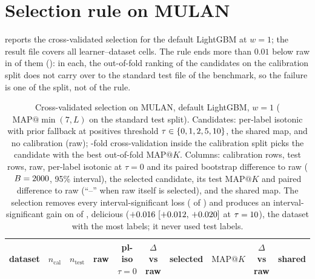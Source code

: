 \documentclass[sigconf,nonacm]{acmart}
\makeatletter
\newcommand{\mapk}{\mathrm{MAP}@K\xspace}
\makeatother
\begin{document}
\section{Selection rule on MULAN}
\label{app:tau}
 reports the cross-validated selection for the default LightGBM at $w{=}1$; the result file covers all \nnTauCells{} learner--dataset cells. The rule ends more than $0.01$ below raw in \nnTauSelBelowRaw{} of them (\ntauFailCells): in each, the out-of-fold ranking of the candidates on the calibration split does not carry over to the standard test file of the benchmark, so the failure is one of the split, not of the rule.
\begin{table}[p]
\caption{Cross-validated selection on MULAN, default LightGBM, $w{=}1$ ($\mathrm{MAP}@\min(7,L)$ on the standard test split). Candidates: per-label isotonic with prior fallback at positives threshold $\tau\in\{0, 1, 2, 5, 10\}$, the shared map, and no calibration (raw); \ntauFolds-fold cross-validation inside the calibration split picks the candidate with the best out-of-fold $\mapk$. Columns: calibration rows, test rows, raw, per-label isotonic at $\tau=0$ and its paired bootstrap difference to raw ($B=2000$, 95\% interval), the selected candidate, its test $\mapk$ and paired difference to raw (``--'' when raw itself is selected), and the shared map. The selection removes every interval-significant loss (\nnHurtAfterTau{} of \nnMulan) and produces an interval-significant gain on \nnTauSigGain{} of \nnMulan, delicious ($+0.016~[+0.012,\,+0.020]$ at $\tau=10$), the dataset with the most labels; it never used test labels.}
\label{tab:tau}
\footnotesize
\setlength{\tabcolsep}{4pt}
\begin{tabular}{@{}lrrccccccc@{}}
\toprule
dataset & $n_{\mathrm{cal}}$ & $n_{\mathrm{test}}$ & raw & pl-iso $\tau{=}0$ & $\Delta$ vs raw & selected & $\mapk$ & $\Delta$ vs raw & shared \\
\midrule

\bottomrule
\end{tabular}
\end{table}
\end{document}

